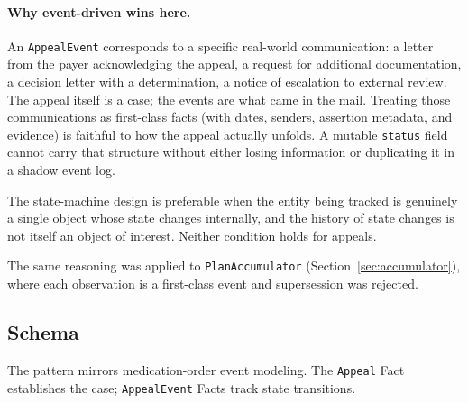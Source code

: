 \documentclass[11pt]{article}
\begin{document}
\paragraph{Why event-driven wins here.}
An \texttt{AppealEvent} corresponds to a specific real-world
communication: a letter from the payer acknowledging the appeal, a
request for additional documentation, a decision letter with a
determination, a notice of escalation to external review. The appeal
itself is a case; the events are what came in the mail. Treating those
communications as first-class facts (with dates, senders, assertion metadata,
and evidence) is faithful to how the appeal actually unfolds. A
mutable \texttt{status} field cannot carry that structure without
either losing information or duplicating it in a shadow event log.

The state-machine design is preferable when the entity being tracked
is genuinely a single object whose state changes internally, and the
history of state changes is not itself an object of interest. Neither
condition holds for appeals.

The same reasoning was applied to \texttt{PlanAccumulator}
(Section~\ref{sec:accumulator}), where each observation is a first-class
event and supersession was rejected.

\subsection{Schema}

The pattern mirrors medication-order event modeling. The \texttt{Appeal} Fact
establishes the case; \texttt{AppealEvent} Facts track state transitions.
\end{document}
